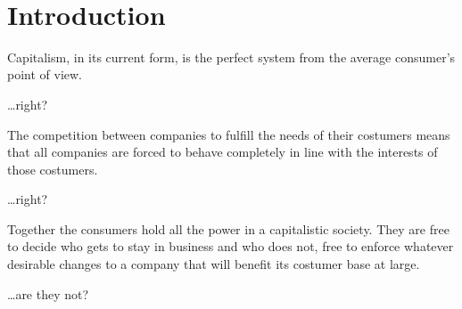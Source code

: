 \documentclass{article}
\begin{document}









\ 

\newpage



\section{Introduction} \label{MSE_intro}

{\itshape
	
	Capitalism, in its current form, is the perfect system from the average consumer's point of view.
	
	\vspace{0.5em}
	
	\ldots right? 
	
	\vspace{0.5em}
	
	\noindent The competition between companies to fulfill the needs of their costumers means that all companies are forced to behave completely in line with the interests of those costumers.
	
	\vspace{0.5em}
	
	\ldots right?
	
	\vspace{0.5em}
	
	\noindent Together the consumers hold all the power in a capitalistic society. They are free to decide who gets to stay in business and who does not, free to enforce whatever desirable changes to a company that will benefit its costumer base at large.
	
	\vspace{0.5em}
	
	\ldots are they not?
	
}
\end{document}
